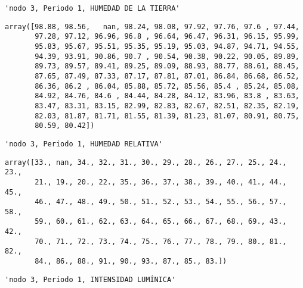 \documentclass[11pt]{article}
\begin{document}
    
    
    \begin{verbatim}
'nodo 3, Periodo 1, HUMEDAD DE LA TIERRA'
    \end{verbatim}

    
    
    \begin{verbatim}
array([98.88, 98.56,   nan, 98.24, 98.08, 97.92, 97.76, 97.6 , 97.44,
       97.28, 97.12, 96.96, 96.8 , 96.64, 96.47, 96.31, 96.15, 95.99,
       95.83, 95.67, 95.51, 95.35, 95.19, 95.03, 94.87, 94.71, 94.55,
       94.39, 93.91, 90.86, 90.7 , 90.54, 90.38, 90.22, 90.05, 89.89,
       89.73, 89.57, 89.41, 89.25, 89.09, 88.93, 88.77, 88.61, 88.45,
       87.65, 87.49, 87.33, 87.17, 87.81, 87.01, 86.84, 86.68, 86.52,
       86.36, 86.2 , 86.04, 85.88, 85.72, 85.56, 85.4 , 85.24, 85.08,
       84.92, 84.76, 84.6 , 84.44, 84.28, 84.12, 83.96, 83.8 , 83.63,
       83.47, 83.31, 83.15, 82.99, 82.83, 82.67, 82.51, 82.35, 82.19,
       82.03, 81.87, 81.71, 81.55, 81.39, 81.23, 81.07, 80.91, 80.75,
       80.59, 80.42])
    \end{verbatim}

    
    
    \begin{verbatim}
'nodo 3, Periodo 1, HUMEDAD RELATIVA'
    \end{verbatim}

    
    
    \begin{verbatim}
array([33., nan, 34., 32., 31., 30., 29., 28., 26., 27., 25., 24., 23.,
       21., 19., 20., 22., 35., 36., 37., 38., 39., 40., 41., 44., 45.,
       46., 47., 48., 49., 50., 51., 52., 53., 54., 55., 56., 57., 58.,
       59., 60., 61., 62., 63., 64., 65., 66., 67., 68., 69., 43., 42.,
       70., 71., 72., 73., 74., 75., 76., 77., 78., 79., 80., 81., 82.,
       84., 86., 88., 91., 90., 93., 87., 85., 83.])
    \end{verbatim}

    
    
    \begin{verbatim}
'nodo 3, Periodo 1, INTENSIDAD LUMÍNICA'
    \end{verbatim}

    
    
\end{document}

